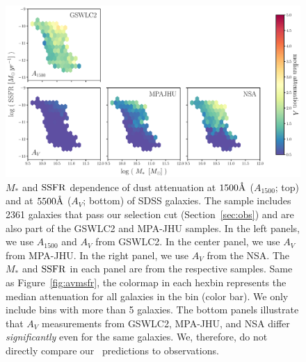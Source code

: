 \begin{figure}
\begin{center}
    \includegraphics[width=\textwidth]{figs/av_mssfr_obs.pdf}
    \caption{\label{fig:av_obs}
    $M_*$ and ${\rm SSFR}$ dependence of dust attenuation at $1500 \AA$
    ($A_{1500}$; top) and at $5500\AA$ ($A_{V}$; bottom) of SDSS galaxies. 
    The sample includes 2361 galaxies that pass our selection cut
    (Section~\ref{sec:obs}) and are also part of the GSWLC2 and MPA-JHU
    samples. 
    In the left panels, we use $A_{1500}$ and $A_V$ from GSWLC2.
    In the center panel, we use $A_V$ from MPA-JHU. 
    In the right panel, we use $A_V$ from the NSA. 
    The $M_*$ and ${\rm SSFR}$ in each panel are from the respective samples. 
    Same as Figure~\ref{fig:avmsfr}, the colormap in each hexbin represents the
    median attenuation for all galaxies in the bin (color bar).
    We only include bins with more than 5 galaxies.
    The bottom panels illustrate that $A_V$ measurements from GSWLC2, MPA-JHU,
    and NSA differ {\em significantly} even for the same galaxies.
    We, therefore, do not directly compare our \eda~predictions to observations. 
    }
\end{center}
\end{figure}

